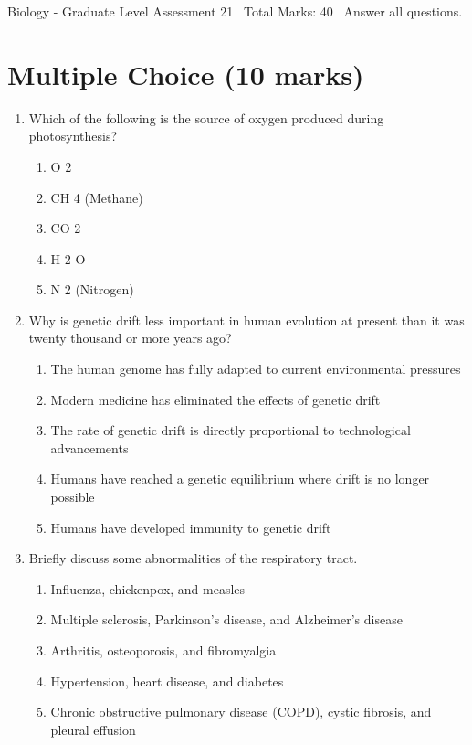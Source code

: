 \documentclass[12pt]{article}
\begin{document}
\begin{center}
Biology - Graduate Level Assessment 21 \
Total Marks: 40 \
Answer all questions.
\end{center}

\section*{Multiple Choice (10 marks)}
\begin{enumerate}[label=\arabic*.]
\item Which of the following is the source of oxygen produced during photosynthesis?
\begin{enumerate}[label=(\alph*)]
    \item O 2
    \item CH 4 (Methane)
    \item CO 2
    \item H 2 O
    \item N 2 (Nitrogen)
\end{enumerate}
\item Why is genetic drift less important in human evolution at present than it was twenty thousand or more years ago?
\begin{enumerate}[label=(\alph*)]
    \item The human genome has fully adapted to current environmental pressures
    \item Modern medicine has eliminated the effects of genetic drift
    \item The rate of genetic drift is directly proportional to technological advancements
    \item Humans have reached a genetic equilibrium where drift is no longer possible
    \item Humans have developed immunity to genetic drift
\end{enumerate}
\item Briefly discuss some abnormalities of the respiratory tract.
\begin{enumerate}[label=(\alph*)]
    \item Influenza, chickenpox, and measles
    \item Multiple sclerosis, Parkinson's disease, and Alzheimer's disease
    \item Arthritis, osteoporosis, and fibromyalgia
    \item Hypertension, heart disease, and diabetes
    \item Chronic obstructive pulmonary disease (COPD), cystic fibrosis, and pleural effusion

\end{enumerate}
\end{enumerate}
\end{document}
